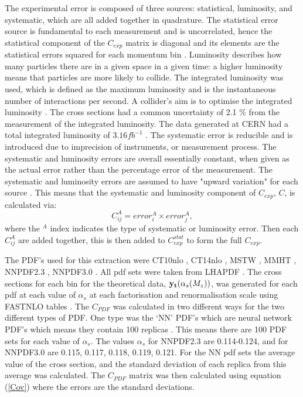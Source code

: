 \documentclass[12pt, onecolumn]{revtex4}    %
\begin{document}
The experimental error is composed of three sources: statistical, luminosity, and systematic, which are all added together in quadrature. The statistical error source  is fundamental to each measurement and is uncorrelated, hence the statistical component of the ${C_{exp}}$ matrix is diagonal and its elements are the statistical errors squared for each momentum bin \cite{DMP}. Luminosity describes how many particles there are in a given space in a given time: a higher luminosity means that particles are more likely to collide. The integrated luminosity was used, which is defined as the maximum luminosity and is the instantaneous number of interactions per second. A collider's aim is to optimise the integrated luminosity \cite{LUM}. The cross sections had a common uncertainty of 2.1 \% from the measurement of the integrated luminosity. The data generated at CERN had a total integrated luminosity of ${3.16   fb^{-1}}$ \cite{HEPP}. The systematic error is reducible and is introduced due to imprecision of instruments, or measurement process. The systematic and luminosity errors are overall essentially constant, when given as the actual error rather than the percentage error of the measurement. The systematic and luminosity errors are assumed to have "upward variation" for each source \cite{HEPD}. This means that the systematic and luminosity component of  ${C_{exp}}$, ${C}$, is calculated via: \begin{equation} \label{Cov} C_{ij}^{A} =  error^{A}_{i} \times error^{A}_{j}, \end{equation} where the ${^A}$ index indicates the type of systematic or luminosity error. Then each ${C_{ij}^{A}}$ are added together, this is then added to ${C_{exp}^{stat}}$ to form the full ${C_{exp}}$.

The PDF's used for this extraction were CT10nlo \cite{CT10}, CT14nlo \cite{CT14}, MSTW \cite{MSTW}, MMHT \cite{MMHT1, MMHT2}, NNPDF2.3 \cite{NN23}, NNPDF3.0 \cite{NN30}. All pdf sets were taken from LHAPDF \cite{LHAPDF}. The cross sections for each bin for the theoretical data, ${\bold{y_t}(\alpha_s(M_z))}$, was generated for each pdf at each value of ${\alpha_s}$ at each factorisation and renormalisation scale using FASTNLO tables \cite{FAST}. The ${C_{PDF}}$ was calculated in two different ways for the two different types of PDF. One type was the `NN' PDF's which are neural network PDF's which means they contain 100 replicas \cite{NN23}.  This means there are 100 PDF sets for each value of ${\alpha_s}$. The values ${\alpha_s}$ for NNPDF2.3 are 0.114-0.124, and for NNPDF3.0 are 0.115, 0.117, 0.118, 0.119, 0.121.  For the NN pdf sets the average value of the cross section, and the standard deviation of each replica from this average was calculated. The ${C_{PDF}}$ matrix was then calculated using equation (\ref{Cov}) where the errors are the standard deviations.
\end{document}
